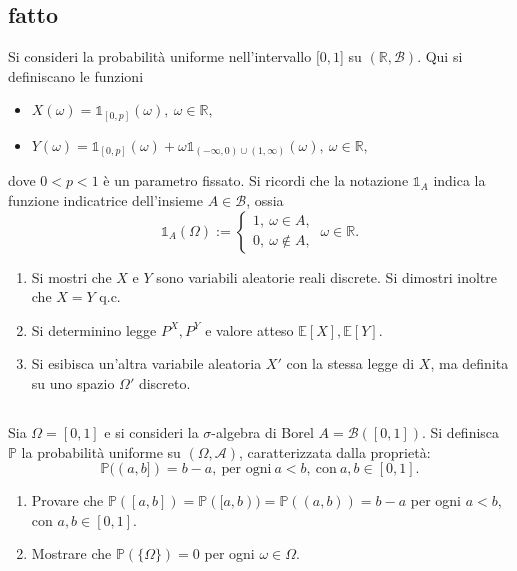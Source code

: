 \subsection{fatto}

Si consideri la probabilità uniforme nell'intervallo $[ 0,1$] su $(\mathbb{R} ,\mathcal{B})$. Qui si definiscano le funzioni
\begin{itemize}
\item $X( \omega ) =\mathbb{1}_{[ 0,p]}( \omega ) ,\ \omega \in \mathbb{R} ,$
\item $Y( \omega ) =\mathbb{1}_{[ 0,p]}( \omega ) +\omega \mathbb{1}_{( -\infty ,0) \cup ( 1,\infty )}( \omega ) ,\ \omega \in \mathbb{R} ,$
\end{itemize}

dove $0< p< 1$ è un parametro fissato. Si ricordi che la notazione $\mathbb{1}_{A}$ indica la funzione indicatrice dell'insieme $A\in \mathcal{B}$, ossia
\begin{equation*}
\mathbb{1}_{A}( \Omega ) :=\begin{cases}
1,\ \omega \in A,\\
0,\ \omega \notin A,
\end{cases} \ \omega \in \mathbb{R} .
\end{equation*}
\begin{enumerate}
\item Si mostri che $X$ e $Y$ sono variabili aleatorie reali discrete. Si dimostri inoltre che $X=Y$ q.c.
\item Si determinino legge $P^{X} ,P^{Y}$ e valore atteso $\mathbb{E}[ X] ,\mathbb{E}[ Y]$.
\item Si esibisca un'altra variabile aleatoria $X\prime $ con la stessa legge di $X$, ma definita su uno spazio $\Omega \prime $ discreto.
\end{enumerate}
\subsection{}

Sia $\Omega =[ 0,1]$ e si consideri la $\sigma $-algebra di Borel $A=\mathcal{B}([ 0,1])$. Si definisca $\mathbb{P}$ la probabilità uniforme su $( \Omega ,\mathcal{A})$, caratterizzata dalla proprietà:
\begin{equation*}
\mathbb{P}(( a,b]) =b-a,\ \text{per ogni} \ a< b,\ \text{con} \ a,b\in [ 0,1] .
\end{equation*}
\begin{enumerate}
\item Provare che $\mathbb{P}([ a,b]) =\mathbb{P}([ a,b)) =\mathbb{P}(( a,b)) =b-a$ per ogni $a< b$, con $a,b\in [ 0,1]$.
\item Mostrare che $\mathbb{P}(\{\Omega \}) =0$ per ogni $\omega \in \Omega $.
\end{enumerate}


